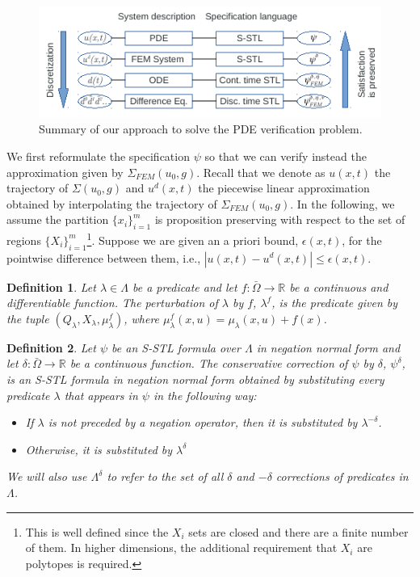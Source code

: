 \documentclass[letterpaper, 10 pt, conference]{ieeeconf/ieeeconf}
\newtheorem{definition}{Definition}
\newcommand*{\R}{\mathbb{R}}
\begin{document}
\begin{figure}[!t]
    \centering 
    \includegraphics[width=0.99\columnwidth]{diagram.png}
    \caption{Summary of our approach to solve the PDE verification problem.}
    \label{fig:diagram}
\end{figure}


We first reformulate the specification $\psi$ so that we can verify instead the
approximation given by $\Sigma_{FEM}(u_0, g)$. Recall that we denote as $u(x,t)$ the
trajectory of $\Sigma(u_0, g)$ and $u^d(x, t)$ the piecewise linear approximation
obtained by interpolating the trajectory of $\Sigma_{FEM}(u_0, g)$. In the following, we
assume the partition $\{x_i\}_{i=1}^m$ is proposition preserving with respect 
to the set of
regions $\{X_i\}_{i = 1}^{m}$\footnote{This is well defined since the $X_i$ sets are
closed and there are a finite number of them. In higher dimensions, the
additional requirement that $X_i$ are polytopes is required.}. Suppose we are given
an a priori bound, $\epsilon(x, t)$, for the pointwise difference between them, i.e., 
$|u(x, t) - u^d(x, t)| \leq \epsilon(x, t)$.

\begin{definition}
\label{def:m_perturbation}
    Let $\lambda \in \Lambda$ be a predicate
    and let $f : \bar\Omega \to \R$ be a continuous and differentiable function. The perturbation of
    $\lambda$ by $f$, $\lambda^f$, is the predicate given by the tuple
    $(Q_\lambda, X_\lambda,
    \mu^f_\lambda)$, where $\mu^f_\lambda(x, u) = \mu_\lambda(x, u) + f(x)$.
\end{definition}

\begin{definition}
\label{def:delta_perturbation}
    Let $\psi$ be an S-STL formula over $\Lambda$ in negation normal form 
    and let $\delta : \bar\Omega \to \R$ be a continuous function. The
    conservative correction of $\psi$ by $\delta$, $\psi^\delta$, is an S-STL
    formula in negation normal form obtained by substituting every predicate
    $\lambda$ that appears in $\psi$ in the following way:

    \begin{itemize}
        \item If $\lambda$ is not preceded by a negation operator, then it is
            substituted by $\lambda^{-\delta}$.
        \item Otherwise, it is substituted by $\lambda^{\delta}$
    \end{itemize}

    We will also use $\Lambda^{\delta}$ to refer to the set of all $\delta$ and
    $-\delta$
    corrections of predicates in $\Lambda$.
\end{definition}
\end{document}
